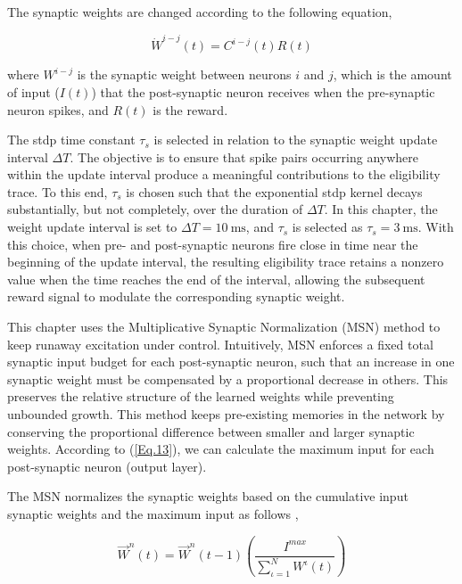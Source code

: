 The synaptic weights are changed according to the following equation,

\begin{equation} \label{Eq.16}
    \dot{W}^{i-j}(t) = C^{i-j}(t)R(t)
\end{equation}

\noindent where $W^{i-j}$ is the synaptic weight between neurons $i$ and $j$, which is the amount of input ($I(t)$) that the post-synaptic neuron receives when the pre-synaptic neuron spikes, and $R(t)$ is the reward.

The \ac{stdp} time constant $\tau_s$ is selected in relation to the synaptic weight update interval $\Delta T$. The objective is to ensure that spike pairs occurring anywhere within the update interval produce a meaningful contributions to the eligibility trace. To this end, $\tau_s$ is chosen such that the exponential \ac{stdp} kernel decays substantially, but not completely, over the duration of $\Delta T$. In this chapter, the weight update interval is set to $\Delta T = 10~\mathrm{ms}$, and $\tau_s$ is selected as $\tau_s = 3~\mathrm{ms}$. With this choice, when pre- and post-synaptic neurons fire close in time near the beginning of the update interval, the resulting eligibility trace retains a nonzero value when the time reaches the end of the interval, allowing the subsequent reward signal to modulate the corresponding synaptic weight.



This chapter uses the Multiplicative Synaptic Normalization (MSN) method to keep runaway excitation under control. Intuitively, MSN enforces a fixed total synaptic input budget for each post-synaptic neuron, such that an increase in one synaptic weight must be compensated by a proportional decrease in others. This preserves the relative structure of the learned weights while preventing unbounded growth. This method keeps pre-existing memories in the network by conserving the proportional difference between smaller and larger synaptic weights. According to (\ref{Eq.13}), we can calculate the maximum input for each post-synaptic neuron (output layer).

The MSN normalizes the synaptic weights based on the cumulative input synaptic weights and the maximum input as follows \cite{Ch5_STDP2},

\begin{equation} \label{Eq.17}
    \overrightarrow{W}^n(t) = \overrightarrow{W}^n(t-1) \left(\frac{{I}^{max}}{\sum_{\iota=1}^{N} W^\iota(t)}\right)
\end{equation}

